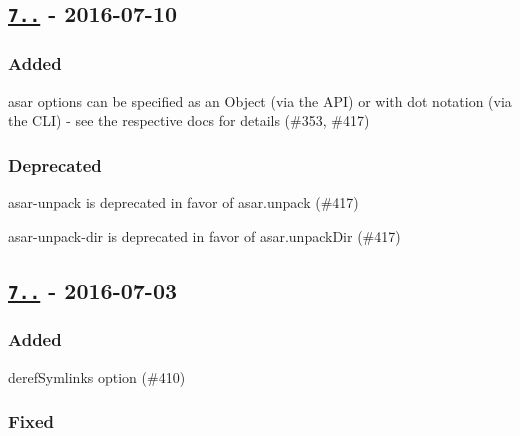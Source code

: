 \subsection*{\href{https://github.com/electron-userland/electron-packager/compare/v7.2.0...v7.3.0}{\tt 7..} -\/ 2016-\/07-\/10}

\subsubsection*{Added}


\begin{DoxyItemize}
\item {\ttfamily asar} options can be specified as an {\ttfamily Object} (via the A\+PI) or with dot notation (via the C\+LI) -\/ see the respective docs for details (\#353, \#417)
\end{DoxyItemize}

\subsubsection*{Deprecated}


\begin{DoxyItemize}
\item {\ttfamily asar-\/unpack} is deprecated in favor of {\ttfamily asar.\+unpack} (\#417)
\item {\ttfamily asar-\/unpack-\/dir} is deprecated in favor of {\ttfamily asar.\+unpack\+Dir} (\#417)
\end{DoxyItemize}

\subsection*{\href{https://github.com/electron-userland/electron-packager/compare/v7.1.0...v7.2.0}{\tt 7..} -\/ 2016-\/07-\/03}

\subsubsection*{Added}


\begin{DoxyItemize}
\item {\ttfamily deref\+Symlinks} option (\#410)
\end{DoxyItemize}

\subsubsection*{Fixed}


